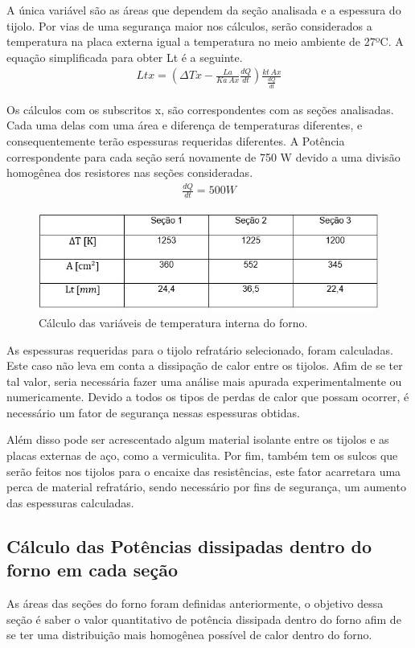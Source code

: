  A única variável são as áreas que dependem da seção analisada e a espessura do tijolo. Por vias de uma segurança maior nos cálculos, serão considerados a temperatura na placa externa igual a temperatura no meio ambiente de 27ºC. A equação simplificada para obter Lt é a seguinte.
\begin{gather}
    Ltx = \left(\Delta Tx - \frac{La}{Ka\, Ax} \frac{dQ}{dt} \right) \frac{kt\, Ax}{\frac{dQ}{dt}}
\end{gather}

Os cálculos com os subscritos x, são correspondentes com as seções analisadas. Cada uma delas com uma área e diferença de temperaturas diferentes, e consequentemente terão espessuras requeridas diferentes. A Potência correspondente para cada seção será novamente de 750 W devido a uma divisão homogênea dos resistores nas seções consideradas.
\begin{gather}
	\frac{dQ}{dt} = 500W \nonumber
\end{gather}

\begin{figure}[H]
	\centering
	\label{tab}
	\includegraphics[keepaspectratio=true,scale=0.7]{figuras/figura17.JPG}
	\caption{Cálculo das variáveis de temperatura interna do forno.}
\end{figure}

As espessuras requeridas para o tijolo refratário selecionado, foram calculadas. Este caso não leva em conta a dissipação de calor entre os tijolos. Afim de se ter tal valor, seria necessária fazer uma análise mais apurada experimentalmente ou numericamente.
Devido a todos os tipos de perdas de calor que possam ocorrer, é necessário um fator de segurança nessas espessuras obtidas.

Além disso pode ser acrescentado algum material isolante entre os tijolos e as placas externas de aço, como a vermiculita.
Por fim, também tem os sulcos que serão feitos nos tijolos para o encaixe das resistências, este fator acarretara uma perca de material refratário, sendo necessário por fins de segurança, um aumento das espessuras calculadas.

\subsection{Cálculo das Potências dissipadas dentro do forno em cada seção}
As áreas das seções do forno foram definidas anteriormente, o objetivo dessa seção é saber o valor quantitativo de potência dissipada dentro do forno afim de se ter uma distribuição mais homogênea possível de calor dentro do forno.

